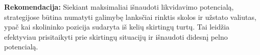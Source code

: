 \documentclass[]{VUMIFTemplateClass}
\begin{document}
\begin{enumerate}
\textbf{Rekomendacija:} Siekiant maksimaliai išnaudoti likvidavimo potencialą, strategijose būtina numatyti galimybę lanksčiai rinktis skolos ir užstato valiutas, ypač kai skolininko pozicija sudaryta iš kelių skirtingų turtų. Tai leidžia efektyviau prisitaikyti prie skirtingų situacijų ir išnaudoti didesnį pelno potencialą.

\end{enumerate}


  

\end{document}
